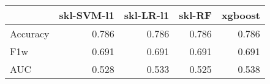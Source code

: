 \begin{tabular}{lrrrr}
\toprule
{} &  skl-SVM-l1 &  skl-LR-l1 &  skl-RF &  xgboost \\
\midrule
Accuracy &       0.786 &      0.786 &   0.786 &    0.786 \\
F1w      &       0.691 &      0.691 &   0.691 &    0.691 \\
AUC      &       0.528 &      0.533 &   0.525 &    0.538 \\
\bottomrule
\end{tabular}
